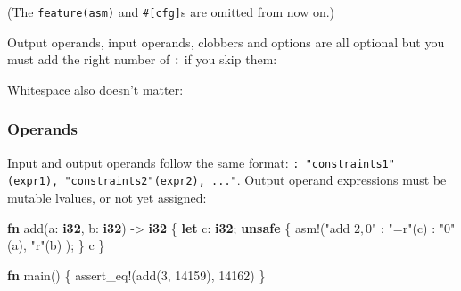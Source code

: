 \documentclass[a4paper,]{book}
\newenvironment{Shaded}{\begin{snugshade}}{\end{snugshade}}
\newcommand{\KeywordTok}[1]{\textcolor[rgb]{0.13,0.29,0.53}{\textbf{{#1}}}}
\newcommand{\DecValTok}[1]{\textcolor[rgb]{0.00,0.00,0.81}{{#1}}}
\newcommand{\StringTok}[1]{\textcolor[rgb]{0.31,0.60,0.02}{{#1}}}
\newcommand{\OtherTok}[1]{\textcolor[rgb]{0.56,0.35,0.01}{{#1}}}
\newcommand{\NormalTok}[1]{{#1}}
\begin{document}
(The \texttt{feature(asm)} and \texttt{\#{[}cfg{]}}s are omitted from
now on.)

Output operands, input operands, clobbers and options are all optional
but you must add the right number of \texttt{:} if you skip them:

\begin{Shaded}
\end{Shaded}

Whitespace also doesn't matter:

\begin{Shaded}
\end{Shaded}

\subsubsection{Operands}\label{operands}

Input and output operands follow the same format:
\texttt{:\ "constraints1"(expr1),\ "constraints2"(expr2),\ ..."}. Output
operand expressions must be mutable lvalues, or not yet assigned:

\begin{Shaded}
\begin{Highlighting}[]
\KeywordTok{fn} \NormalTok{add(a: }\KeywordTok{i32}\NormalTok{, b: }\KeywordTok{i32}\NormalTok{) -> }\KeywordTok{i32} \NormalTok{\{}
    \KeywordTok{let} \NormalTok{c: }\KeywordTok{i32}\NormalTok{;}
    \KeywordTok{unsafe} \NormalTok{\{}
        \OtherTok{asm!}\NormalTok{(}\StringTok{"add $2, $0"}
             \NormalTok{: }\StringTok{"=r"}\NormalTok{(c)}
             \NormalTok{: }\StringTok{"0"}\NormalTok{(a), }\StringTok{"r"}\NormalTok{(b)}
             \NormalTok{);}
    \NormalTok{\}}
    \NormalTok{c}
\NormalTok{\}}

\KeywordTok{fn} \NormalTok{main() \{}
    \OtherTok{assert_eq!}\NormalTok{(add(}\DecValTok{3}\NormalTok{, }\DecValTok{14159}\NormalTok{), }\DecValTok{14162}\NormalTok{)}
\NormalTok{\}}
\end{Highlighting}
\end{Shaded}
\end{document}
